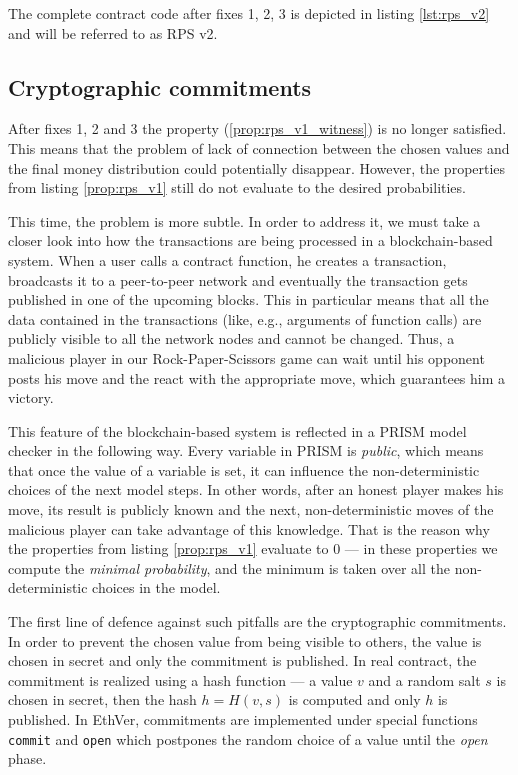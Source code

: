 The complete contract code after fixes 1, 2, 3 is depicted in listing \ref{lst:rps_v2} and will be referred to as RPS v2.



\subsection{Cryptographic commitments}

After fixes 1, 2 and 3 the property (\ref{prop:rps_v1_witness}) is no longer satisfied.
This means that the problem of lack of connection between the chosen values and the final money distribution
could potentially disappear.
However, the properties from listing \ref{prop:rps_v1} still do not evaluate to the desired probabilities.

This time, the problem is more subtle.
In order to address it, we must take a closer look into how the transactions are being processed
in a blockchain-based system.
When a user calls a contract function, he creates a transaction, broadcasts it to a peer-to-peer network and 
eventually the transaction gets published in one of the upcoming blocks.
This in particular means that all the data contained in the transactions (like, e.g., arguments of function calls)
are publicly visible to all the network nodes and cannot be changed.
Thus, a malicious player in our Rock-Paper-Scissors game can wait until his opponent posts his move and 
the react with the appropriate move, which guarantees him a victory.

This feature of the blockchain-based system is reflected in a PRISM model checker in the following way.
Every variable in PRISM is \emph{public}, which means that once the value of a variable is set, it can influence
the non-deterministic choices of the next model steps.
In other words, after an honest player makes his move, its result is publicly known and the next, non-deterministic
moves of the malicious player can take advantage of this knowledge.
That is the reason why the properties from listing \ref{prop:rps_v1} evaluate to 0 --- in these properties we compute the
\emph{minimal probability}, and the minimum is taken over all the non-deterministic choices in the model.

The first line of defence against such pitfalls are the cryptographic commitments.
In order to prevent the chosen value from being visible to others, the value is chosen in secret and only
the commitment is published.
In real contract, the commitment is realized using a hash function --- a value $v$ and a random salt $s$ is chosen
in secret, then the hash $h = H(v, s)$ is computed and only $h$ is published.
In EthVer, commitments are implemented under special functions \lstinline{commit} and \lstinline{open} which
postpones the random choice of a value until the \emph{open} phase.

